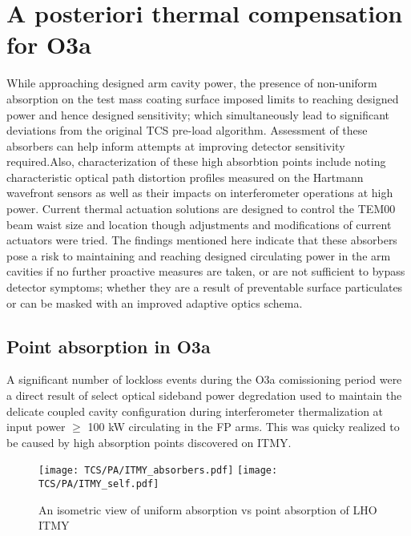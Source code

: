 \section{A posteriori thermal compensation for O3a}
While approaching designed arm cavity power, the presence of non-uniform absorption on the test mass coating surface imposed limits to reaching designed power and hence designed sensitivity; which simultaneously lead to significant deviations from the original TCS pre-load algorithm.  Assessment of these absorbers can help inform attempts at improving detector sensitivity required.Also, characterization of these high absorbtion points include noting characteristic optical path distortion profiles measured on the Hartmann wavefront sensors as well as their impacts on interferometer operations at high power. Current thermal actuation solutions are designed to control the TEM00 beam waist size and location though adjustments and modifications of current actuators were tried. The findings mentioned here indicate that these absorbers pose a risk to maintaining and reaching designed circulating power in the arm cavities if no further proactive measures are taken, or are not sufficient to bypass detector symptoms; whether they are a result of preventable surface particulates or can be masked with an improved adaptive optics schema.  


\subsection{Point absorption in O3a}
A significant number of lockloss events during the O3a comissioning period were a direct result of select optical sideband power degredation used to maintain the delicate coupled cavity configuration during interferometer thermalization at input power $\geq$ 100 kW circulating in the FP arms. This was quicky realized to be caused by high absorption points discovered on ITMY.  
\begin{figure}[H]
  \centering
  \begin{subcaptiongroup}
	  \texttt{[image: TCS/PA/ITMY\_absorbers.pdf]}
	  \label{subfig:itmypajustself}
	  \texttt{[image: TCS/PA/ITMY\_self.pdf]}
	  \label{subfig:itmypaselfplusabs}
  \end{subcaptiongroup}
  \captionsetup{subrefformat=parens}
  \vspace{-19mm}
  \caption{An isometric view of uniform absorption vs point absorption of LHO ITMY}
  \label{fig:ITMYpabs}
\end{figure}

